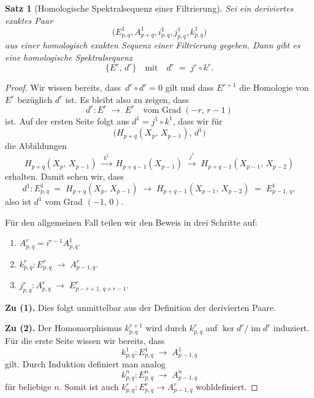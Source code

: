 \documentclass[12pt]{article}
\numberwithin{conj}{section}
\newtheorem{theorem}[conj]{Satz}
\newcommand{\ima}{\operatorname{im}}
\begin{document}
    \begin{theorem}[Homologische Spektralsequenz einer Filtrierung]
        Sei ein deriviertes exaktes Paar
        \[
            \bigl(E^{1}_{p,q}, A^{1}_{p+q}, i^{1}_{p,q}, j^{1}_{p,q}, k^{1}_{p,q}\bigr)
        \]
        aus einer homologisch exakten Sequenz einer Filtrierung gegeben. Dann gibt
        es eine homologische Spektralsequenz
        \[
            \{E^{r},\,d^{r}\}\quad\text{mit}\quad d^{r} \;=\; j^{r} \circ k^{r}.
        \]
    \end{theorem}

    \begin{proof}
        Wir wissen bereits, dass $\,d^{r} \circ d^{r} = 0$ gilt und dass $E^{r+1}$
        die Homologie von $E^{r}$ bezüglich $d^{r}$ ist. Es bleibt also zu zeigen,
        dass
        \[
            d^{r} : E^{r} \;\longrightarrow\; E^{r} \quad\text{vom Grad}\; (-r,\,r-1)
        \]
        ist. Auf der ersten Seite folgt aus $d^{1} = j^{1} \circ k^{1}$, dass wir
        für
        \[
             \bigl(H_{p+q}(X_{p},\,X_{p-1}),\,d^{1}\bigr)
        \]
        die Abbildungen
        \[
            H_{p+q}(X_{p},\,X_{p-1}) \;\xrightarrow{\;k^1\;}\; H_{p+q-1}(X_{p-1}) \;\xrightarrow
            {\;j^1\;}\; H_{p+q-1}(X_{p-1},\,X_{p-2})
        \]
        erhalten. Damit sehen wir, dass
        \[
            d^{1} : E^{1}_{p,q}\;=\; H_{p+q}(X_{p},\,X_{p-1}) \;\longrightarrow\; H_{p+q-1}
            (X_{p-1},\,X_{p-2}) \;=\; E^{1}_{p-1,\,q},
        \]
        also ist $d^{1}$ vom Grad $(-1,\,0)$.

        Für den allgemeinen Fall teilen wir den Beweis in drei Schritte auf:

        \begin{enumerate}[nolistsep]
            \item $A^{r}_{p,q}= i^{r-1} A^{1}_{p,q} $.

            \item $k^{r}_{p,q}: E^{r}_{p,q}\;\longrightarrow\; A^{r}_{p-1,q}$.

            \item $j^{r}_{p,q}: A^{r}_{p,q}\;\longrightarrow\; E^{r}_{p-r+1,\,q+r-1}$.
        \end{enumerate}

        \noindent
        \textbf{Zu (1).} Dies folgt unmittelbar aus der Definition der derivierten
        Paare.

        \smallskip
        \noindent
        \textbf{Zu (2).} Der Homomorphismus $k^{r+1}_{p,q}$ wird durch $k^{r}_{p,q}$
        auf $\ker d^{r} / \ima d^{r}$ induziert. Für die erste Seite wissen wir
        bereits, dass
        \[
            k^{1}_{p,q}: E^{1}_{p,q}\;\longrightarrow\; A^{1}_{p-1,q}
        \]
        gilt. Durch Induktion definiert man analog
        \[
            k^{n}_{p,q}: E^{n}_{p,q}\;\longrightarrow\; A^{n}_{p-1,q}
        \]
        für beliebige $n$. Somit ist auch $k^{r}_{p,q}: E^{r}_{p,q}\to A^{r}_{p-1,q}$
        wohldefiniert.


\end{proof}
\end{document}
